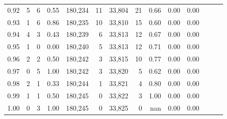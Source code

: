 \begin{tabular}{rrrrrrrrrrrrrr}
0.92 &      5 &    6 &  0.55 &  180,234 &       11 &  33,804 &      21 &  0.66 &  0.00 &      0.00 \\
0.93 &      1 &    6 &  0.86 &  180,235 &       10 &  33,810 &      15 &  0.60 &  0.00 &      0.00 \\
0.94 &      4 &    3 &  0.43 &  180,239 &        6 &  33,813 &      12 &  0.67 &  0.00 &      0.00 \\
0.95 &      1 &    0 &  0.00 &  180,240 &        5 &  33,813 &      12 &  0.71 &  0.00 &      0.00 \\
0.96 &      2 &    2 &  0.50 &  180,242 &        3 &  33,815 &      10 &  0.77 &  0.00 &      0.00 \\
0.97 &      0 &    5 &  1.00 &  180,242 &        3 &  33,820 &       5 &  0.62 &  0.00 &      0.00 \\
0.98 &      2 &    1 &  0.33 &  180,244 &        1 &  33,821 &       4 &  0.80 &  0.00 &      0.00 \\
0.99 &      1 &    1 &  0.50 &  180,245 &        0 &  33,822 &       3 &  1.00 &  0.00 &      0.00 \\
1.00 &      0 &    3 &  1.00 &  180,245 &        0 &  33,825 &       0 &   nan &  0.00 &      0.00 \\
\bottomrule
\end{tabular}
